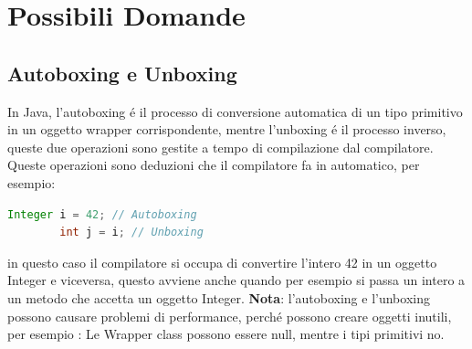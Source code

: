 \documentclass[11pt]{article}
\begin{document}
\section {Possibili Domande}
\subsection{Autoboxing e Unboxing}
    In Java, l'autoboxing é il processo di conversione automatica di un tipo primitivo in un oggetto wrapper corrispondente, mentre l'unboxing é il processo inverso,
    queste due operazioni sono gestite a tempo di compilazione dal compilatore.
    Queste operazioni sono deduzioni che il compilatore fa in automatico, per esempio:
    \begin{lstlisting}[language=Java]
        Integer i = 42; // Autoboxing
        int j = i; // Unboxing
    \end{lstlisting}
    in questo caso il compilatore si occupa di convertire l'intero 42 in un oggetto Integer e viceversa, questo avviene anche quando per esempio si passa un intero a un metodo che accetta un oggetto Integer.
    \textbf{Nota}: l'autoboxing e l'unboxing possono causare problemi di performance, perché possono creare oggetti inutili, per esempio
    : Le Wrapper class possono essere null, mentre i tipi primitivi no.
\end{document}
